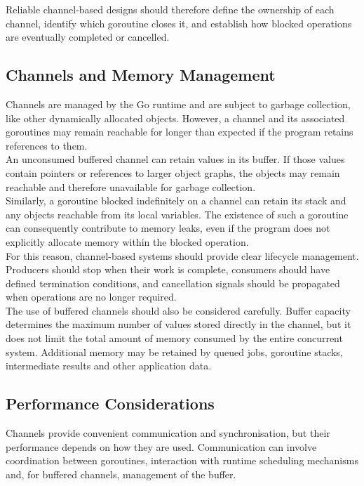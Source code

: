 Reliable channel-based designs should therefore define the ownership of each channel, identify which goroutine closes it, and establish how blocked operations are eventually completed or cancelled.

\subsection{Channels and Memory Management}

Channels are managed by the Go runtime and are subject to garbage collection, like other dynamically allocated objects. However, a channel and its associated goroutines may remain reachable for longer than expected if the program retains references to them.\\

An unconsumed buffered channel can retain values in its buffer. If those values contain pointers or references to larger object graphs, the objects may remain reachable and therefore unavailable for garbage collection.\\

Similarly, a goroutine blocked indefinitely on a channel can retain its stack and any objects reachable from its local variables. The existence of such a goroutine can consequently contribute to memory leaks, even if the program does not explicitly allocate memory within the blocked operation.\\

For this reason, channel-based systems should provide clear lifecycle management. Producers should stop when their work is complete, consumers should have defined termination conditions, and cancellation signals should be propagated when operations are no longer required.\\

The use of buffered channels should also be considered carefully. Buffer capacity determines the maximum number of values stored directly in the channel, but it does not limit the total amount of memory consumed by the entire concurrent system. Additional memory may be retained by queued jobs, goroutine stacks, intermediate results and other application data.

\subsection{Performance Considerations}

Channels provide convenient communication and synchronisation, but their performance depends on how they are used. Communication can involve coordination between goroutines, interaction with runtime scheduling mechanisms and, for buffered channels, management of the buffer.\\


